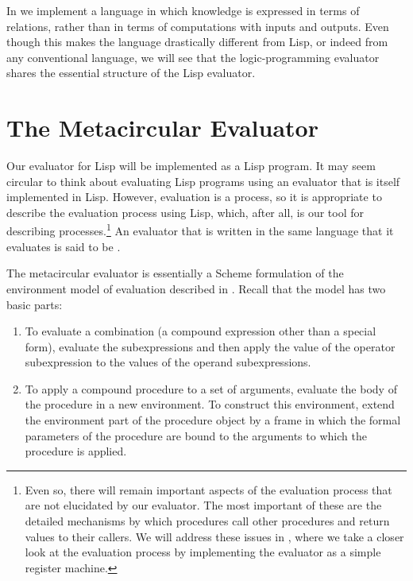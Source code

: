 In  we implement a  language in
which knowledge is expressed in terms of relations, rather than in terms of
computations with inputs and outputs.  Even though this makes the language
drastically different from Lisp, or indeed from any conventional language, we
will see that the logic-programming evaluator shares the essential structure of
the Lisp evaluator.



\section{The Metacircular Evaluator}
\label{Section 4.1}

Our evaluator for Lisp will be implemented as a Lisp program.  It may seem
circular to think about evaluating Lisp programs using an evaluator that is
itself implemented in Lisp.  However, evaluation is a process, so it is
appropriate to describe the evaluation process using Lisp, which, after all, is
our tool for describing processes.\footnote{Even so, there will remain
important aspects of the evaluation process that are not elucidated by our
evaluator.  The most important of these are the detailed mechanisms by which
procedures call other procedures and return values to their callers.  We will
address these issues in , where we take a closer look at the
evaluation process by implementing the evaluator as a simple register machine.}
An evaluator that is written in the same language that it evaluates is said to
be .

The metacircular evaluator is essentially a Scheme formulation of the
environment model of evaluation described in .  Recall that
the model has two basic parts:

\begin{enumerate}

\item
To evaluate a combination (a compound expression other than a special form),
evaluate the subexpressions and then apply the value of the operator
subexpression to the values of the operand subexpressions.

\item
To apply a compound procedure to a set of arguments, evaluate the body of the
procedure in a new environment.  To construct this environment, extend the
environment part of the procedure object by a frame in which the formal
parameters of the procedure are bound to the arguments to which the procedure
is applied.

\end{enumerate}

